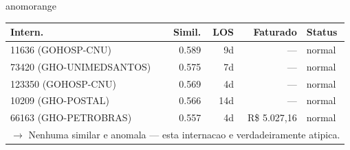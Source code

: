 \documentclass[a4paper,10pt]{article}
\begin{document}
\begin{anomalycard}[Internacao 163882 | GHO-PETROBRAS | ALTO (z=4.85)]{anomorange}
\begin{tabular}{l r r r l}\toprule\textbf{Intern.} & \textbf{Simil.} & \textbf{LOS} & \textbf{Faturado} & \textbf{Status} \\\midrule
11636 (GOHOSP-CNU) & 0.589 & 9d & --- & \textcolor{jcubeblue}{normal} \\
73420 (GHO-UNIMEDSANTOS) & 0.575 & 7d & --- & \textcolor{jcubeblue}{normal} \\
123350 (GOHOSP-CNU) & 0.569 & 4d & --- & \textcolor{jcubeblue}{normal} \\
10209 (GHO-POSTAL) & 0.566 & 14d & --- & \textcolor{jcubeblue}{normal} \\
66163 (GHO-PETROBRAS) & 0.557 & 4d & R\$ 5.027,16 & \textcolor{jcubeblue}{normal} \\
\multicolumn{5}{l}{\textcolor{jcubeblue}{\small $\rightarrow$ Nenhuma similar e anomala --- esta internacao e verdadeiramente atipica.}} \\
\bottomrule\end{tabular}


\end{anomalycard}

\newpage
\end{document}
